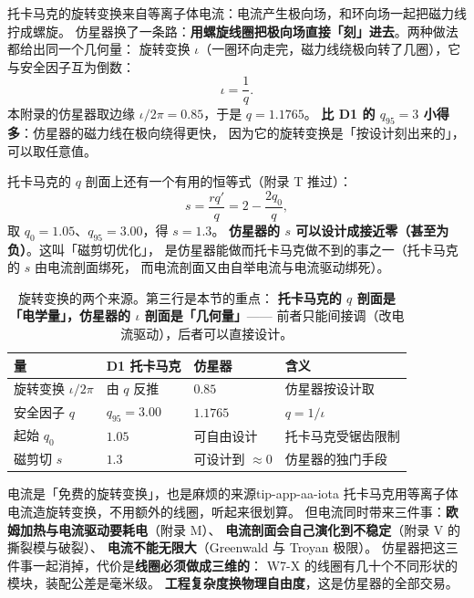 托卡马克的旋转变换来自等离子体电流：电流产生极向场，和环向场一起把磁力线拧成螺旋。
仿星器换了一条路：\textbf{用螺旋线圈把极向场直接「刻」进去}。两种做法都给出同一个几何量：
旋转变换 $\iota$（一圈环向走完，磁力线绕极向转了几圈），它与安全因子互为倒数：
\begin{equation}
\iota = \frac{1}{q}.
\label{eq:app-aa-iota}
\end{equation}
本附录的仿星器取边缘 $\iota/2\pi = 0.85$，于是 $q = 1.1765$。
\textbf{比 D1 的 $q_{95}=3$ 小得多}：仿星器的磁力线在极向绕得更快，
因为它的旋转变换是「按设计刻出来的」，可以取任意值。

托卡马克的 $q$ 剖面上还有一个有用的恒等式（附录 T 推过）：
\begin{equation}
s = \frac{r q'}{q} = 2 - \frac{2q_0}{q},
\label{eq:app-aa-shear}
\end{equation}
取 $q_0 = 1.05$、$q_{95} = 3.00$，得 $s = 1.3$。
\textbf{仿星器的 $s$ 可以设计成接近零（甚至为负）}。这叫「磁剪切优化」，
是仿星器能做而托卡马克做不到的事之一（托卡马克的 $s$ 由电流剖面绑死，
而电流剖面又由自举电流与电流驱动绑死）。

\begin{table}[htbp]
\centering
\small
\caption{旋转变换的两个来源。第三行是本节的重点：
\textbf{托卡马克的 $q$ 剖面是「电学量」，仿星器的 $\iota$ 剖面是「几何量」}——
前者只能间接调（改电流驱动），后者可以直接设计。}
\label{tab:app-aa-iota}
\begin{tabular}{p{3.4cm}p{3.2cm}p{3.2cm}p{3.3cm}}
\toprule
量 & D1 托卡马克 & 仿星器 & 含义 \\
\midrule
旋转变换 $\iota/2\pi$ & 由 $q$ 反推 & $0.85$ & 仿星器按设计取 \\
安全因子 $q$ & $q_{95} = 3.00$ & $1.1765$ & $q = 1/\iota$ \\
起始 $q_0$ & $1.05$ & 可自由设计 & 托卡马克受锯齿限制 \\
磁剪切 $s$ & $1.3$ & 可设计到 $\approx 0$ & 仿星器的独门手段 \\
\bottomrule
\end{tabular}

\end{table}

\begin{tip}{电流是「免费的旋转变换」，也是麻烦的来源}{tip-app-aa-iota}
托卡马克用等离子体电流造旋转变换，不用额外的线圈，听起来很划算。
但电流同时带来三件事：\textbf{欧姆加热与电流驱动要耗电}（附录 M）、
\textbf{电流剖面会自己演化到不稳定}（附录 V 的撕裂模与破裂）、
\textbf{电流不能无限大}（Greenwald 与 Troyan 极限）。
仿星器把这三件事一起消掉，代价是\textbf{线圈必须做成三维的}：
W7-X 的线圈有几十个不同形状的模块，装配公差是毫米级。
\textbf{工程复杂度换物理自由度}，这是仿星器的全部交易。
\end{tip}

